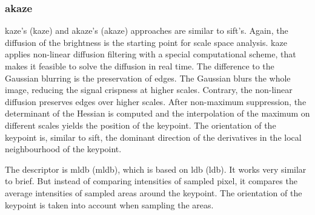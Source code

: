 \subsubsection{\acrshort{akaze}}

\acrshort{kaze}'s\cite{alcantarilla_eccv12} (\acrlong{kaze}) and \acrshort{akaze}'s\cite{alcantarilla_bmva13} (\acrlong{akaze}) approaches are similar to \acrshort{sift}'s.
Again, the diffusion of the brightness is the starting point for scale space analysis.
\acrshort{kaze} applies non-linear diffusion filtering with a special computational scheme, that makes it feasible to solve the diffusion in real time.
The difference to the Gaussian blurring is the preservation of edges.
The Gaussian blurs the whole image, reducing the signal crispness at higher scales.
Contrary, the non-linear diffusion preserves edges over higher scales.
After non-maximum suppression, the determinant of the Hessian is computed and the interpolation of the maximum on different scales yields the position of the keypoint.
The orientation of the keypoint is, similar to \acrshort{sift}, the dominant direction of the derivatives in the local neighbourhood of the keypoint.

The descriptor is \acrshort{mldb} (\acrlong{mldb}), which is based on \acrshort{ldb}\cite{yang_ismar12} (\acrlong{ldb}).
It works very similar to \acrshort{brief}.
But instead of comparing intensities of sampled pixel, it compares the average intensities of sampled areas around the keypoint.
The orientation of the keypoint is taken into account when sampling the areas.
